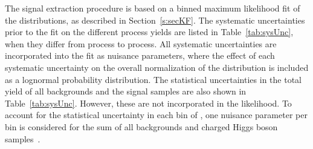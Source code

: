 The signal extraction procedure is based on a binned maximum likelihood fit of
the \mjj distributions, as described in Section~\ref{s:secKF}. The systematic
uncertainties prior to the fit on the different process yields are listed in
Table~\ref{tab:sysUnc}, when they differ from process to process. All systematic
uncertainties are incorporated into the fit as nuisance parameters, where the
effect of each systematic uncertainty on the overall normalization of the \mjj
distribution is included as a lognormal probability distribution.  The
statistical uncertainties in the total yield of all backgrounds and the signal
samples are also shown in Table~\ref{tab:sysUnc}. However, these are not
incorporated in the likelihood. To account for the statistical uncertainty in
each bin of \mjj, one nuisance parameter per bin is considered for the sum of
all backgrounds and charged Higgs boson samples~\cite{Barlow:1993dm}.


